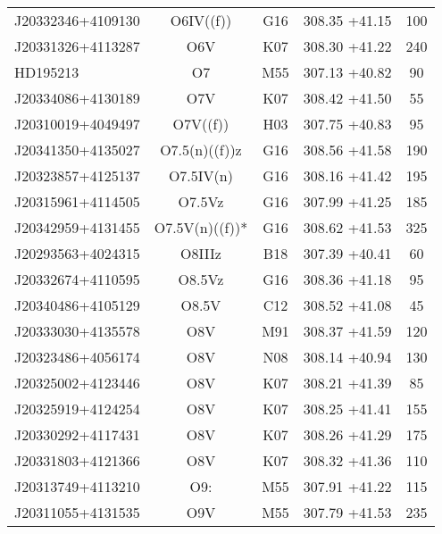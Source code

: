 \documentclass{aa} %
\begin{document}
\begin{appendix}
\begin{table*}[p!]
\begin{tabular}{lcccc}
\small{J20332346+4109130} & \small{O6IV((f))} & \small{G16}& \small{308.35 +41.15} & \small{100} \\
\small{J20331326+4113287} & \small{O6V} & \small{K07}& \small{308.30 +41.22} & \small{ 240} \\ 
\small{HD195213 } & \small{O7} & \small{M55}& \small{307.13 +40.82} & \small{90}\\ 
\small{J20334086+4130189} & \small{O7V} & \small{K07}& \small{308.42 +41.50} & \small{55} \\
\small{J20310019+4049497} & \small{O7V((f))} & \small{H03}& \small{307.75 +40.83} & \small{95}\\
\small{J20341350+4135027} & \small{O7.5(n)((f))z} & \small{G16} & \small{308.56 +41.58}& \small{190} \\	
\small{J20323857+4125137} & \small{O7.5IV(n)} & \small{G16}& \small{308.16 +41.42} & \small{195} \\
\small{J20315961+4114505} & \small{O7.5Vz} & \small{G16} & \small{307.99 +41.25} & \small{185}\\
\small{J20342959+4131455} & \small{O7.5V(n)((f))*} & \small{G16}& \small{308.62 +41.53} & \small{325} \\
\small{J20293563+4024315} & \small{O8IIIz} & \small{B18} & \small{307.39 +40.41} & \small{60}\\
\small{J20332674+4110595} & \small{O8.5Vz} & \small{G16} & \small{308.36 +41.18}& \small{95} \\
\small{J20340486+4105129} & \small{O8.5V} & \small{C12}& \small{308.52 +41.08} & \small{45} \\
\small{J20333030+4135578} & \small{O8V} & \small{M91}& \small{308.37 +41.59} & \small{120} \\	
\small{J20323486+4056174} & \small{O8V} & \small{N08} & \small{308.14 +40.94} & \small{130}\\
\small{J20325002+4123446} & \small{O8V} & \small{K07} & \small{308.21 +41.39} & \small{85}\\
\small{J20325919+4124254} & \small{O8V} & \small{K07} & \small{308.25 +41.41} & \small{155}\\		
\small{J20330292+4117431} & \small{O8V} & \small{K07} & \small{308.26 +41.29} & \small{175}\\	
\small{J20331803+4121366} & \small{O8V} & \small{K07}& \small{308.32 +41.36} & \small{110} \\
\small{J20313749+4113210} & \small{O9:} & \small{M55}& \small{307.91 +41.22} & \small{115} \\
\small{J20311055+4131535} & \small{O9V} & \small{M55} & \small{307.79 +41.53}& \small{235} \\	

\end{tabular}
\end{table*}
\end{appendix}
\end{document}
